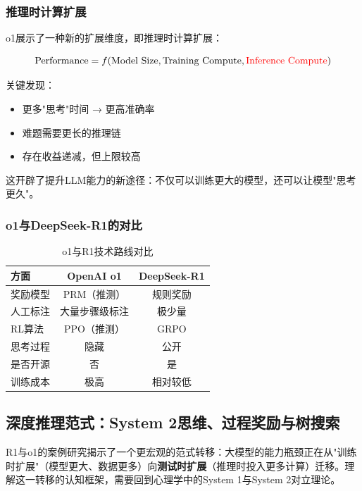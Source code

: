 \documentclass[12pt,a4paper]{article}
\begin{document}
\subsubsection{推理时计算扩展}

o1展示了一种新的扩展维度，即推理时计算扩展：

\begin{equation}
\text{Performance} = f(\text{Model Size}, \text{Training Compute}, \textcolor{red}{\text{Inference Compute}})
\end{equation}

关键发现：
\begin{itemize}
    \item 更多"思考"时间 → 更高准确率
    \item 难题需要更长的推理链
    \item 存在收益递减，但上限较高
\end{itemize}

这开辟了提升LLM能力的新途径：不仅可以训练更大的模型，还可以让模型"思考更久"。

\subsubsection{o1与DeepSeek-R1的对比}

\begin{table}[H]
\centering
\caption{o1与R1技术路线对比}
\begin{tabular}{lcc}
\toprule
\textbf{方面} & \textbf{OpenAI o1} & \textbf{DeepSeek-R1} \\
\midrule
奖励模型 & PRM（推测） & 规则奖励 \\
人工标注 & 大量步骤级标注 & 极少量 \\
RL算法 & PPO（推测） & GRPO \\
思考过程 & 隐藏 & 公开 \\
是否开源 & 否 & 是 \\
训练成本 & 极高 & 相对较低 \\
\bottomrule
\end{tabular}
\end{table}

\subsection{深度推理范式：System 2思维、过程奖励与树搜索}
\label{sec:system2-reasoning}

R1与o1的案例研究揭示了一个更宏观的范式转移：大模型的能力瓶颈正在从"训练时扩展"（模型更大、数据更多）向\textbf{测试时扩展}（推理时投入更多计算）迁移。理解这一转移的认知框架，需要回到心理学中的System 1与System 2对立理论。
\end{document}
